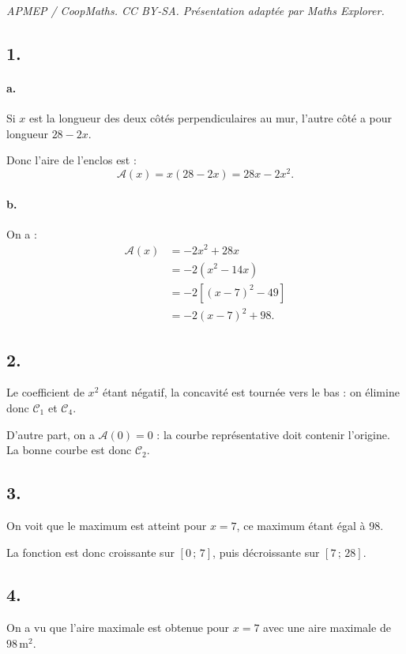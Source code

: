 \documentclass[10pt]{article}
\begin{document}
\noindent\textit{APMEP / CoopMaths. CC BY-SA. Présentation adaptée par Maths Explorer.}\par\medskip
\subsection*{1.}

\paragraph{a.} Si \( x \) est la longueur des deux côtés perpendiculaires au mur, l'autre côté a pour longueur \( 28 - 2x \).

Donc l'aire de l'enclos est :
\[
\mathcal{A}(x) = x(28 - 2x) = 28x - 2x^2.
\]

\paragraph{b.} On a :
\begin{align*}
\mathcal{A}(x) &= -2x^2 + 28x \\
&= -2 \left(x^2 - 14x\right) \\
&= -2 \left[(x - 7)^2 - 49\right] \\
&= -2(x - 7)^2 + 98.
\end{align*}

\subsection*{2.}

Le coefficient de \( x^2 \) étant négatif, la concavité est tournée vers le bas : on élimine donc \( \mathcal{C}_1 \) et \( \mathcal{C}_4 \).

D'autre part, on a \( \mathcal{A}(0) = 0 \) : la courbe représentative doit contenir l'origine. La bonne courbe est donc \( \mathcal{C}_2 \).

\subsection*{3.}

On voit que le maximum est atteint pour \( x = 7 \), ce maximum étant égal à 98.

La fonction est donc croissante sur \( [0 \,;\, 7] \), puis décroissante sur \( [7 \,;\, 28] \).

\begin{center}
\end{center}

\subsection*{4.}

On a vu que l'aire maximale est obtenue pour \( x = 7 \) avec une aire maximale de \( 98 \, \text{m}^2 \).
\end{document}
